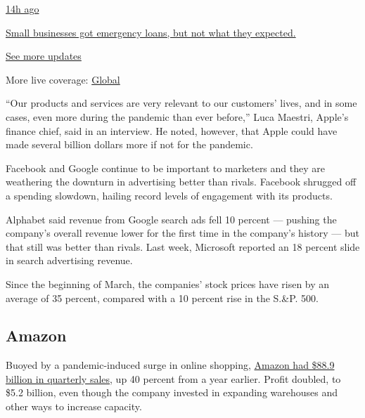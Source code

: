 \href{https://www.nytimes.com/live/2020/08/03/business/stock-market-today-coronavirus?action=click\&pgtype=Article\&state=default\&region=MAIN_CONTENT_1\&context=storylines_live_updates\#small-businesses-got-emergency-loans-but-not-what-they-expected}{14h
ago}

\href{https://www.nytimes.com/live/2020/08/03/business/stock-market-today-coronavirus?action=click\&pgtype=Article\&state=default\&region=MAIN_CONTENT_1\&context=storylines_live_updates\#small-businesses-got-emergency-loans-but-not-what-they-expected}{Small
businesses got emergency loans, but not what they expected.}

\href{https://www.nytimes.com/live/2020/08/03/business/stock-market-today-coronavirus?action=click\&pgtype=Article\&state=default\&region=MAIN_CONTENT_1\&context=storylines_live_updates}{See
more updates}

More live coverage:
\href{https://www.nytimes.com/2020/08/03/world/coronavirus-covid-19.html?action=click\&pgtype=Article\&state=default\&region=MAIN_CONTENT_1\&context=storylines_live_updates}{Global}

``Our products and services are very relevant to our customers' lives,
and in some cases, even more during the pandemic than ever before,''
Luca Maestri, Apple's finance chief, said in an interview. He noted,
however, that Apple could have made several billion dollars more if not
for the pandemic.

Facebook and Google continue to be important to marketers and they are
weathering the downturn in advertising better than rivals. Facebook
shrugged off a spending slowdown, hailing record levels of engagement
with its products.

Alphabet said revenue from Google search ads fell 10 percent --- pushing
the company's overall revenue lower for the first time in the company's
history --- but that still was better than rivals. Last week, Microsoft
reported an 18 percent slide in search advertising revenue.

Since the beginning of March, the companies' stock prices have risen by
an average of 35 percent, compared with a 10 percent rise in the S.\&P.
500.

\hypertarget{amazon}{%
\subsection{Amazon}\label{amazon}}

Buoyed by a pandemic-induced surge in online shopping,
\href{https://www.nytimes.com/2020/05/22/technology/amazon-coronavirus-target-walmart.html}{Amazon
had \$88.9 billion in quarterly sales}, up 40 percent from a year
earlier. Profit doubled, to \$5.2 billion, even though the company
invested in expanding warehouses and other ways to increase capacity.

